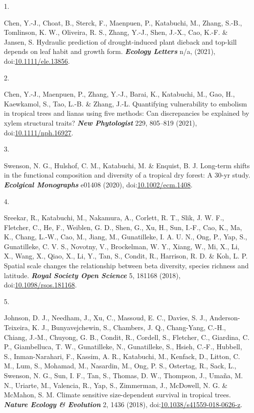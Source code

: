 \documentclass[
]{article}
\newlength{\cslhangindent}
\newlength{\csllabelwidth}
\newlength{\cslentryspacingunit} %
\newenvironment{CSLReferences}[2] %
 {%
  \setlength{\parindent}{0pt}
  \ifodd #1
  \let\oldpar\par
  \def\par{\hangindent=\cslhangindent\oldpar}
  \fi
  \setlength{\parskip}{#2\cslentryspacingunit}
 }%
 {}
\newcommand{\CSLLeftMargin}[1]{\parbox[t]{\csllabelwidth}{#1}}
\newcommand{\CSLRightInline}[1]{\parbox[t]{\linewidth - \csllabelwidth}{#1}\break}
\begin{document}
\begin{CSLReferences}{0}{0}
\leavevmode{}%
\CSLLeftMargin{1. }
\CSLRightInline{Chen, Y.-J., Choat, B., Sterck, F., Maenpuen, P.,
Katabuchi, M., Zhang, S.-B., Tomlinson, K. W., Oliveira, R. S., Zhang,
Y.-J., Shen, J.-X., Cao, K.-F. \& Jansen, S. Hydraulic prediction of
drought-induced plant dieback and top-kill depends on leaf habit and
growth form. \textbf{\emph{Ecology Letters}} n/a, (2021),
doi:\href{https://doi.org/10.1111/ele.13856}{10.1111/ele.13856}.}

\leavevmode{}%
\CSLLeftMargin{2. }
\CSLRightInline{Chen, Y.-J., Maenpuen, P., Zhang, Y.-J., Barai, K.,
Katabuchi, M., Gao, H., Kaewkamol, S., Tao, L.-B. \& Zhang, J.-L.
Quantifying vulnerability to embolism in tropical trees and lianas using
five methods: Can discrepancies be explained by xylem structural traits?
\textbf{\emph{New Phytologist}} 229, 805--819 (2021),
doi:\href{https://doi.org/10.1111/nph.16927}{10.1111/nph.16927}.}

\leavevmode{}%
\CSLLeftMargin{3. }
\CSLRightInline{Swenson, N. G., Hulshof, C. M., Katabuchi, M. \&
Enquist, B. J. Long-term shifts in the functional composition and
diversity of a tropical dry forest: A 30-yr study.
\textbf{\emph{Ecolgical Monographs}} e01408 (2020),
doi:\href{https://doi.org/10.1002/ecm.1408}{10.1002/ecm.1408}.}

\leavevmode{}%
\CSLLeftMargin{4. }
\CSLRightInline{Sreekar, R., Katabuchi, M., Nakamura, A., Corlett, R.
T., Slik, J. W. F., Fletcher, C., He, F., Weiblen, G. D., Shen, G., Xu,
H., Sun, I.-F., Cao, K., Ma, K., Chang, L.-W., Cao, M., Jiang, M.,
Gunatilleke, I. A. U. N., Ong, P., Yap, S., Gunatilleke, C. V. S.,
Novotny, V., Brockelman, W. Y., Xiang, W., Mi, X., Li, X., Wang, X.,
Qiao, X., Li, Y., Tan, S., Condit, R., Harrison, R. D. \& Koh, L. P.
Spatial scale changes the relationship between beta diversity, species
richness and latitude. \textbf{\emph{Royal Society Open Science}} 5,
181168 (2018),
doi:\href{https://doi.org/10.1098/rsos.181168}{10.1098/rsos.181168}.}

\leavevmode{}%
\CSLLeftMargin{5. }
\CSLRightInline{Johnson, D. J., Needham, J., Xu, C., Massoud, E. C.,
Davies, S. J., Anderson-Teixeira, K. J., Bunyavejchewin, S., Chambers,
J. Q., Chang-Yang, C.-H., Chiang, J.-M., Chuyong, G. B., Condit, R.,
Cordell, S., Fletcher, C., Giardina, C. P., Giambelluca, T. W.,
Gunatilleke, N., Gunatilleke, S., Hsieh, C.-F., Hubbell, S.,
Inman-Narahari, F., Kassim, A. R., Katabuchi, M., Kenfack, D., Litton,
C. M., Lum, S., Mohamad, M., Nasardin, M., Ong, P. S., Ostertag, R.,
Sack, L., Swenson, N. G., Sun, I. F., Tan, S., Thomas, D. W., Thompson,
J., Umaña, M. N., Uriarte, M., Valencia, R., Yap, S., Zimmerman, J.,
McDowell, N. G. \& McMahon, S. M. {Climate sensitive size-dependent
survival in tropical trees}. \textbf{\emph{Nature Ecology {\&}
Evolution}} 2, 1436 (2018),
doi:\href{https://doi.org/10.1038/s41559-018-0626-z}{10.1038/s41559-018-0626-z}.}


\end{CSLReferences}
\end{document}
